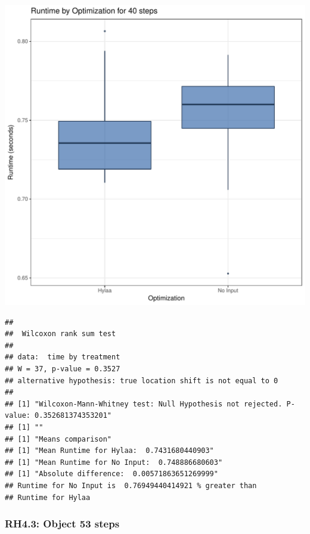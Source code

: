 \documentclass{article}\usepackage[]{graphicx}\usepackage[]{color}
\makeatletter
\def\maxwidth{ %
  \ifdim\Gin@nat@width>\linewidth
    \linewidth
  \else
    \Gin@nat@width
  \fi
}
\newenvironment{kframe}{%
 \def\at@end@of@kframe{}%
 \ifinner\ifhmode%
  \def\at@end@of@kframe{\end{minipage}}%
  \begin{minipage}{\columnwidth}%
 \fi\fi%
 \def\FrameCommand##1{\hskip\@totalleftmargin \hskip-\fboxsep
 \colorbox{shadecolor}{##1}\hskip-\fboxsep
     \hskip-\linewidth \hskip-\@totalleftmargin \hskip\columnwidth}%
 \MakeFramed {\advance\hsize-\width
   \@totalleftmargin\z@ \linewidth\hsize
   \@setminipage}}%
 {\par\unskip\endMakeFramed%
 \at@end@of@kframe}
\newenvironment{knitrout}{}{} %
\makeatother
\begin{document}
\begin{knitrout}
\color{fgcolor}
\includegraphics[width=\maxwidth]{figure/RH4_steps40-1} 
\begin{kframe}\begin{verbatim}
## 
## 	Wilcoxon rank sum test
## 
## data:  time by treatment
## W = 37, p-value = 0.3527
## alternative hypothesis: true location shift is not equal to 0
## 
## [1] "Wilcoxon-Mann-Whitney test: Null Hypothesis not rejected. P-value: 0.352681374353201"
## [1] ""
## [1] "Means comparison"
## [1] "Mean Runtime for Hylaa:  0.7431680440903"
## [1] "Mean Runtime for No Input:  0.748886680603"
## [1] "Absolute difference:  0.00571863651269999"
## Runtime for No Input is  0.76949440414921 % greater than 
## Runtime for Hylaa
\end{verbatim}
\end{kframe}
\end{knitrout}


\subsubsection{RH4.3: Object 53 steps}
\end{document}
